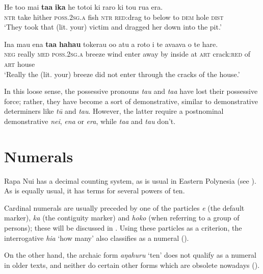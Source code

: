\ea\label{ex:4.9}
\gll He to{\ꞌ}o mai \textbf{ta{\ꞌ}a} \textbf{ika} he totoi ki raro ki tou rua era. \\
\textsc{ntr} take hither \textsc{poss.2sg.a} fish \textsc{ntr} \textsc{red}:drag to below to \textsc{dem} hole \textsc{dist} \\

\glt 
‘They took that (lit. your) victim and dragged her down into the pit.’ \textstyleExampleref{[R368.099]} 
\z

\ea\label{ex:4.10}
\gll {\ꞌ}Ina mau ena \textbf{ta{\ꞌ}a} \textbf{hahau} tokerau o{\ꞌ}o atu a roto i te avaava  o te hare.\\
\textsc{neg} really \textsc{med} \textsc{poss.2sg.a} breeze wind enter away by inside at \textsc{art} crack:\textsc{red}  of \textsc{art} house\\

\glt
‘Really the (lit. your) breeze did not enter through the cracks of the house.’ \textstyleExampleref{[R347.055]} 
\z

In this loose sense, the possessive pronouns \textit{ta{\ꞌ}u} and \textit{ta{\ꞌ}a} have lost their possessive force; rather, they have become a sort of demonstrative, similar to demonstrative determiners like \textit{tū} and \textit{tau}. However, the latter require a postnominal demonstrative \textit{nei}, \textit{ena} or \textit{era}, while \textit{ta{\ꞌ}a} and \textit{ta{\ꞌ}u} don’t.

\section{Numerals}\label{sec:4.3}
Rapa Nui has a decimal counting system, as is usual in Eastern Polynesia (see \citealt{Lemaître1985}). As is equally usual, it has terms for several powers of ten.

Cardinal numerals are usually preceded by one of the particles \textit{e} (the default marker), \textit{ka} (the contiguity marker) and \textit{hoko} (when referring to a group of persons); these will be discussed in . Using these particles as a criterion, the interrogative \textit{hia} ‘how many’ also classifies as a numeral ().

On the other hand, the archaic form \textit{{\ꞌ}aŋahuru} ‘ten’ does not qualify as a numeral in older texts, and neither do certain other forms which are obsolete nowadays ().

